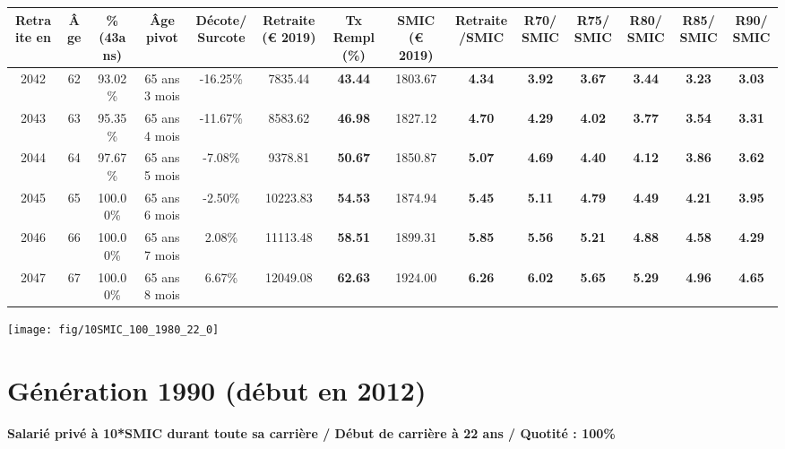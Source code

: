 \begin{adjustbox}{max width=\textwidth} 
\begin{tabular}[htb]{|c|c||c|c|c||c|c||c|c||c|c|c|c|c|} 
\hline 
 Retraite en &  Âge &  \%(43ans) &  Âge pivot &  Décote/Surcote &  Retraite (\euro{} 2019) &  Tx Rempl(\%) &  SMIC (\euro{} 2019) &  Retraite/SMIC &  R70/SMIC &  R75/SMIC &  R80/SMIC &  R85/SMIC &  R90/SMIC \\ 
\hline \hline 
 2042 &  62 &  93.02\% &  65 ans 3 mois &  -16.25\% &  7835.44 &  {\bf 43.44} &  1803.67 &  {\bf 4.34} &  {\bf 3.92} &  {\bf 3.67} &  {\bf 3.44} &  {\bf 3.23} &  {\bf 3.03} \\ 
\hline 
 2043 &  63 &  95.35\% &  65 ans 4 mois &  -11.67\% &  8583.62 &  {\bf 46.98} &  1827.12 &  {\bf 4.70} &  {\bf 4.29} &  {\bf 4.02} &  {\bf 3.77} &  {\bf 3.54} &  {\bf 3.31} \\ 
\hline 
 2044 &  64 &  97.67\% &  65 ans 5 mois &  -7.08\% &  9378.81 &  {\bf 50.67} &  1850.87 &  {\bf 5.07} &  {\bf 4.69} &  {\bf 4.40} &  {\bf 4.12} &  {\bf 3.86} &  {\bf 3.62} \\ 
\hline 
 2045 &  65 &  100.00\% &  65 ans 6 mois &  -2.50\% &  10223.83 &  {\bf 54.53} &  1874.94 &  {\bf 5.45} &  {\bf 5.11} &  {\bf 4.79} &  {\bf 4.49} &  {\bf 4.21} &  {\bf 3.95} \\ 
\hline 
 2046 &  66 &  100.00\% &  65 ans 7 mois &  2.08\% &  11113.48 &  {\bf 58.51} &  1899.31 &  {\bf 5.85} &  {\bf 5.56} &  {\bf 5.21} &  {\bf 4.88} &  {\bf 4.58} &  {\bf 4.29} \\ 
\hline 
 2047 &  67 &  100.00\% &  65 ans 8 mois &  6.67\% &  12049.08 &  {\bf 62.63} &  1924.00 &  {\bf 6.26} &  {\bf 6.02} &  {\bf 5.65} &  {\bf 5.29} &  {\bf 4.96} &  {\bf 4.65} \\ 
\hline 
\hline 
\end{tabular} 
\end{adjustbox} 
 
 \vspace{0.1cm} 

 {\hspace{-2.2cm}\texttt{[image: fig/10SMIC\_100\_1980\_22\_0]}} 

\newpage 
 
\section{Génération 1990 (début en 2012)\label{10SMIC_100_1990_22_0}} 
 
{\bf \noindent Salarié privé à 10*SMIC durant toute sa carrière / Début de carrière à 22 ans / Quotité : 100\%}  ~ 

